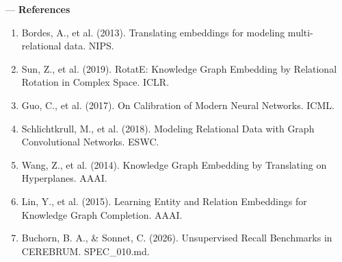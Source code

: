 \documentclass[10pt,journal,compsoc]{IEEEtran}
\begin{document}
---
\textbf{References}
\begin{enumerate}
\item Bordes, A., et al. (2013). Translating embeddings for modeling multi-relational data. NIPS.
\item Sun, Z., et al. (2019). RotatE: Knowledge Graph Embedding by Relational Rotation in Complex Space. ICLR.
\item Guo, C., et al. (2017). On Calibration of Modern Neural Networks. ICML.
\item Schlic\-htkrull, M., et al. (2018). Modeling Relational Data with Graph Convol\-utional Networks. ESWC.
\item Wang, Z., et al. (2014). Knowledge Graph Embedding by Translating on Hyperplanes. AAAI.
\item Lin, Y., et al. (2015). Learning Entity and Relation Embeddings for Knowledge Graph Completion. AAAI.
\item Buchorn, B. A., \& Sonnet, C. (2026). Unsupe\-rvised Recall Benchmarks in CEREBRUM. SPEC\_010.md.

\end{enumerate}



\end{document}
